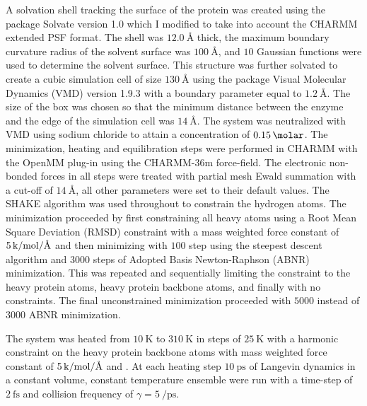 A solvation shell tracking the surface of the protein was created using the package Solvate version 1.0 \cite{grubmullerSolvate} which I modified to take into account the CHARMM extended PSF format. The shell was $\SI{12.0}{\angstrom}$ thick, the maximum boundary curvature radius of the solvent surface was $\SI{100}{\angstrom}$, and $10$ Gaussian functions were used to determine the solvent surface. This structure was further solvated to create a cubic simulation cell of size $\SI{130}{\angstrom}$ using the package Visual Molecular Dynamics (VMD) version 1.9.3 \cite{HUMP96} with a boundary parameter equal to $\SI{1.2}{\angstrom}$. The size of the box was chosen so that the minimum distance between the enzyme and the edge of the simulation cell was  $\SI{14}{\angstrom}$. The system was neutralized with VMD using sodium chloride to attain a concentration of $\SI{0.15}{\molar}$. 
The minimization, heating and equilibration steps were performed in CHARMM with the OpenMM \cite{OpenMMRapidDevelopment} plug-in using the CHARMM-36m \cite{huangCHARMM36AllatomAdditive2013} force-field. The electronic non-bonded forces in all steps were treated with partial mesh Ewald summation with a cut-off of $\SI{14}{\angstrom}$, all other parameters were set to their default values. The SHAKE \cite{ryckaertNumericalIntegrationCartesian1977b} algorithm was used throughout to constrain the hydrogen atoms. The minimization proceeded by first constraining all heavy atoms  using a Root Mean Square Deviation (RMSD) constraint with a mass weighted force constant of $\SI{5}{\kilo\cal\per\mol\per\angstrom}$ and then minimizing with $100$ step using the steepest descent algorithm and $3000$ steps of Adopted Basis Newton-Raphson (ABNR) minimization. This was repeated and sequentially limiting the  constraint to the heavy protein atoms, heavy protein backbone atoms, and finally with no constraints. The final unconstrained minimization proceeded with $5000$ instead of $3000$ ABNR minimization. 

The system was heated from $\SI{10}{\kelvin}$ to $\SI{310}{\kelvin}$ in steps of $\SI{25}{\kelvin}$ with a harmonic constraint on the heavy protein backbone atoms with mass weighted force constant of $\SI{5}{\kilo\cal\per\mol\per\angstrom}$ and . At each heating step $\SI{10}{\pico\second}$ of Langevin dynamics in a constant volume, constant temperature ensemble were run with a time-step of $\SI{2}{\femto\second}$ and collision frequency of $\gamma=\SI{5}{\per\pico\second}$. 

